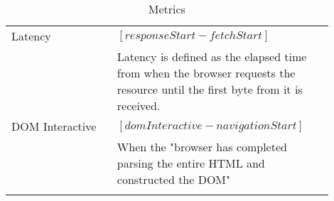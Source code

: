 \begin{center}
\begin{longtable}{ | p{0.3\linewidth} | p{0.6\linewidth} | }
	\hline
	Latency
	& $[responseStart - fetchStart]$ \\ 
	& Latency is defined as the elapsed time from when the browser requests the resource until the first byte from it is received.  \\ %

	\hline
	DOM Interactive
	& $[domInteractive - navigationStart]$ \\
	& When the "browser has completed parsing the entire HTML and constructed the DOM" \\ %

	


	\hline
	\caption{Metrics} %
	\label{tab:navigationtiming_metrics}
	\end{longtable}
\end{center}








